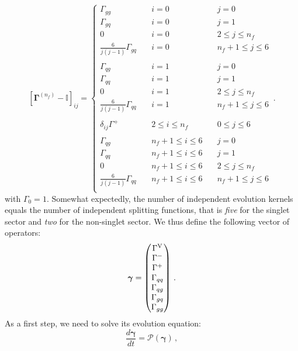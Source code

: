 \documentclass[10pt,a4paper]{article}
\begin{document}
\newpage
\begin{equation}
\left[{\bm\Gamma}^{(n_f)}-\mathbb{I}\right]_{ij}=
\left\{
\begin{array}{lll}
\Gamma_{gg} & \quad i = 0 &\quad j = 0\\
\Gamma_{gq} & \quad i = 0 & \quad j=1\\
0 &\quad i = 0 & \quad 2 \leq j \leq n_f\\
\frac{6}{j(j-1)}\Gamma_{gq} &\quad i = 0 & \quad n_f+1 \leq j \leq 6\\
\\
\Gamma_{qg} & \quad i = 1 &\quad j = 0\\
\Gamma_{qq} & \quad i = 1 & \quad j=1\\
0 &\quad i = 1 & \quad 2 \leq j \leq n_f\\
\frac{6}{j(j-1)}\Gamma_{qq} &\quad i = 1 & \quad n_f+1 \leq j \leq 6\\
\\
\delta_{ij}\Gamma^+ & \quad 2 \leq i \leq n_f & \quad 0 \leq j \leq 6\\
\\
\Gamma_{qg} & \quad n_f+1 \leq i \leq 6  &\quad j = 0\\
\Gamma_{qq} & \quad n_f+1 \leq i \leq 6  & \quad j=1\\
0 &\quad n_f+1 \leq i \leq 6 & \quad 2 \leq j \leq n_f\\
\frac{6}{j(j-1)}\Gamma_{qq} &\quad n_f+1 \leq i \leq 6 & \quad n_f+1 \leq j \leq 6\\
\end{array}
\right.\,.
\end{equation}
with $\Gamma_0=1$. Somewhat expectedly, the number of independent
evolution kernels equals the number of independent splitting
functions, that is \textit{five} for the singlet sector and
\textit{two} for the non-singlet sector. We thus define the following
vector of operators:
\begin{equation}
{\bm \gamma} =
\begin{pmatrix}
\Gamma^{\rm V}\\
\Gamma^-\\
\Gamma^+\\
\Gamma_{qq}\\
\Gamma_{qg}\\
\Gamma_{gq}\\
\Gamma_{gg}
\end{pmatrix}\,.
\end{equation}
As a first step, we need to solve its evolution equation:
\begin{equation}\label{eq:DGLAPop}
  \frac{d{\bm \gamma}}{dt}=\mathcal{P}({\bm \gamma})\,,
\end{equation}
\end{document}
